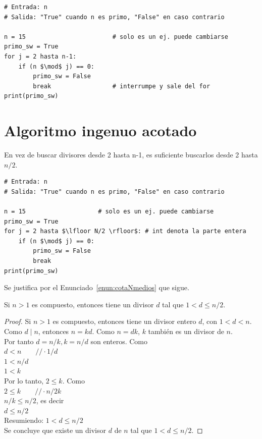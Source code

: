 \begin{lstlisting}[caption={Algoritmo algo menos ingenuo de testeo de primalidad}, label={alg:AlgIngenuo2}, mathescape=true]
# Entrada: n
# Salida: "True" cuando n es primo, "False" en caso contrario

n = 15                        # solo es un ej. puede cambiarse
primo_sw = True 
for j = 2 hasta n-1: 
    if (n $\mod$ j) == 0:          
        primo_sw = False
        break                 # interrumpe y sale del for
print(primo_sw)
\end{lstlisting}

\section{Algoritmo ingenuo acotado}
En vez de buscar divisores desde 2 hasta n-1, es suficiente buscarlos desde 2 hasta $n/2$. 

\begin{lstlisting}[caption={Algoritmo ingenuo de testeo de primalidad acotado}, label={alg:AlgIngenuoAcotado}, mathescape=true]
# Entrada: n
# Salida: "True" cuando n es primo, "False" en caso contrario

n = 15                    # solo es un ej. puede cambiarse
primo_sw = True 
for j = 2 hasta $\lfloor N/2 \rfloor$: # int denota la parte entera
    if (n $\mod$ j) == 0:        
        primo_sw = False
        break               
print(primo_sw)
\end{lstlisting}

\vspace{\baselineskip}
\noindent Se justifica por el Enunciado~\ref{enun:cotaNmedios} que sigue.

\begin{enunciado} \label{enun:cotaNmedios}\leavevmode\par Si $n > 1$ es compuesto, entonces tiene un divisor $d$ tal que $1 < d \leq n/2$.
\end{enunciado}

\begin{proof} Si $n > 1$ es compuesto, entonces tiene un divisor entero $d$, con $1 < d < n$. \\ 
Como $d \mid n$, entonces $n = kd$. Como $n = dk$, $k$ también es un divisor de $n$. \\ 
Por tanto $d = n/k, k = n/d$ son enteros. Como  \\ 
$d < n \qquad //  \cdot 1/d$ \\ 
$1 < n/d$ \\ 
$1 < k$ \\ 
Por lo tanto, $2 \leq k$. Como \\ 
 $2 \leq k \qquad // \cdot n/2k$ \\ 
$n/k \leq n/2$, es decir \\ 
 $d  \leq n/2$ \\ 
Resumiendo: $1 < d  \leq n/2$ \\ 
Se concluye que existe un divisor $d$ de $n$ tal que $1 < d \leq n/2$. 
\end{proof}

